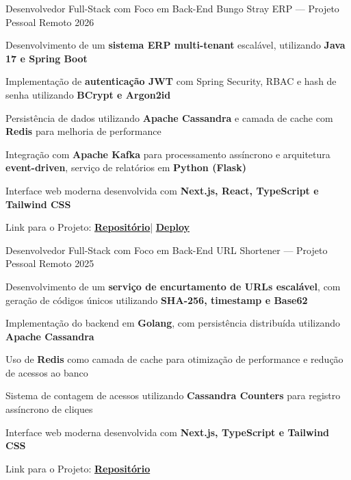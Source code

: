 \begin{cventries}
  \cventry
    {Desenvolvedor Full-Stack com Foco em Back-End} %
    {Bungo Stray ERP — Projeto Pessoal} %
    {Remoto} %
    {2026} %
    {
      \begin{cvitems} %
	\item {Desenvolvimento de um \textbf{sistema ERP multi-tenant} escalável, utilizando \textbf{Java 17 e Spring Boot}}
	\item {Implementação de \textbf{autenticação JWT} com Spring Security, RBAC e hash de senha utilizando \textbf{BCrypt e Argon2id}}
	\item {Persistência de dados utilizando \textbf{Apache Cassandra} e camada de cache com \textbf{Redis} para melhoria de performance}
	\item {Integração com \textbf{Apache Kafka} para processamento assíncrono e arquitetura \textbf{event-driven}, serviço de relatórios em \textbf{Python (Flask)}}
	\item {Interface web moderna desenvolvida com \textbf{Next.js, React, TypeScript e Tailwind CSS}}
	\item {Link para o Projeto: \href{https://github.com/SobralCybersec/BungouStrayERP}{\textbf{Repositório}}| \href{https://bungoustraydogs.vercel.app/}{\textbf{Deploy}}}
      \end{cvitems}
    }

  \cventry
    {Desenvolvedor Full-Stack com Foco em Back-End} %
    {URL Shortener — Projeto Pessoal} %
    {Remoto} %
    {2025} %
    {
      \begin{cvitems} %
	\item {Desenvolvimento de um \textbf{serviço de encurtamento de URLs escalável}, com geração de códigos únicos utilizando \textbf{SHA-256, timestamp e Base62}}
	\item {Implementação do backend em \textbf{Golang}, com persistência distribuída utilizando \textbf{Apache Cassandra}}
	\item {Uso de \textbf{Redis} como camada de cache para otimização de performance e redução de acessos ao banco}
	\item {Sistema de contagem de acessos utilizando \textbf{Cassandra Counters} para registro assíncrono de cliques}
	\item {Interface web moderna desenvolvida com \textbf{Next.js, TypeScript e Tailwind CSS}}
	\item {Link para o Projeto: \href{https://github.com/SobralCybersec/JujutsuKaisenShorten}{\textbf{Repositório}}}
      \end{cvitems}
    }

\end{cventries}
